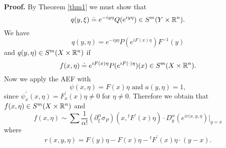 \documentclass[12pt,reqno]{amsart}
\theoremstyle{plain}  %
\theoremstyle{definition}
\newcommand{\nin}{\noindent}
\begin{document}
\nin
{\bf Proof.}  By Theorem \ref{thm1} we must show that
\begin{equation}
	\label{2'}
	q(y, \xi) \doteq e^{-iy \eta} Q(e^{iy \eta} ) \in S^m (Y \times \Bbb R^n).
\end{equation}
We have
$$q(y, \eta) = e^{-iy \eta} P(e^{iF(x) \eta}) F^{-1} (y) $$
and $ q(y, \eta) \in S^m (X \times \Bbb R^n) $ if
$$f(x, \eta) \doteq e^{iF(x) \eta} P(e^{iF(\cdot) \eta}) (x) \in S^m (X \times
\Bbb R^n).$$
Now we apply the AEF with
$$\psi (x, \eta) = F(x) \eta \text{ and } a(y, \eta) = 1, $$
since $ \psi^\prime_x (x, \eta) = F^\prime_x (x) \eta \ne 0 $ for $ \eta \ne 0$.
Therefore we obtain that $ f(x, \eta) \in S^m(X \times \Bbb R^n) $ and
$$f(x, \eta) \sim \sum \frac{1}{\alpha !} \left ( \partial^\alpha_\xi \sigma_P
\right ) (x, {}^tF^\prime (x) \eta) \cdot D^\alpha_y (e^{ir(x, y, \eta}) \bigg
|_{y=x}$$ where
$$r(x, y, \eta) = F(y) \eta - F(x) \eta - {}^tF^\prime (x) \eta \cdot  (y - x). $$
%
\end{document}
